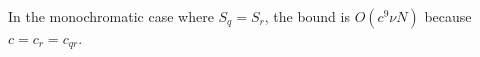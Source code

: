 


%


In the monochromatic case where $S_q = S_r$, the bound is $O(c^9 \nu N)$ because
$c = c_r = c_{qr}$.

